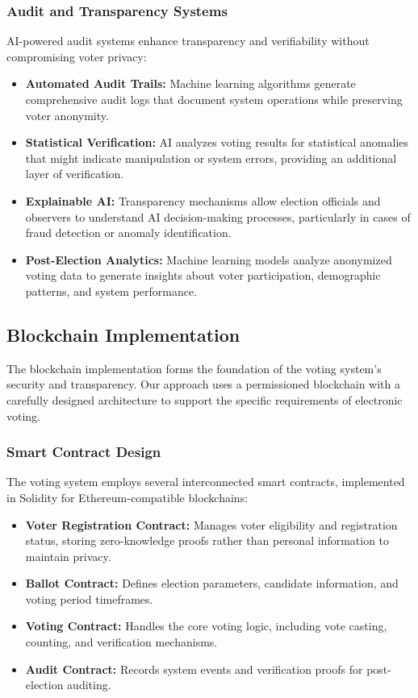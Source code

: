 \documentclass[conference]{IEEEtran}
\begin{document}
\subsubsection{Audit and Transparency Systems}
AI-powered audit systems enhance transparency and verifiability without compromising voter privacy:

\begin{itemize}
    \item \textbf{Automated Audit Trails:} Machine learning algorithms generate comprehensive audit logs that document system operations while preserving voter anonymity.
    
    \item \textbf{Statistical Verification:} AI analyzes voting results for statistical anomalies that might indicate manipulation or system errors, providing an additional layer of verification.
    
    \item \textbf{Explainable AI:} Transparency mechanisms allow election officials and observers to understand AI decision-making processes, particularly in cases of fraud detection or anomaly identification.
    
    \item \textbf{Post-Election Analytics:} Machine learning models analyze anonymized voting data to generate insights about voter participation, demographic patterns, and system performance.
\end{itemize}

\subsection{Blockchain Implementation}
The blockchain implementation forms the foundation of the voting system's security and transparency. Our approach uses a permissioned blockchain with a carefully designed architecture to support the specific requirements of electronic voting.

\subsubsection{Smart Contract Design}
The voting system employs several interconnected smart contracts, implemented in Solidity for Ethereum-compatible blockchains:

\begin{itemize}
    \item \textbf{Voter Registration Contract:} Manages voter eligibility and registration status, storing zero-knowledge proofs rather than personal information to maintain privacy.
    
    \item \textbf{Ballot Contract:} Defines election parameters, candidate information, and voting period timeframes.
    
    \item \textbf{Voting Contract:} Handles the core voting logic, including vote casting, counting, and verification mechanisms.
    
    \item \textbf{Audit Contract:} Records system events and verification proofs for post-election auditing.
\end{itemize}
\end{document}
